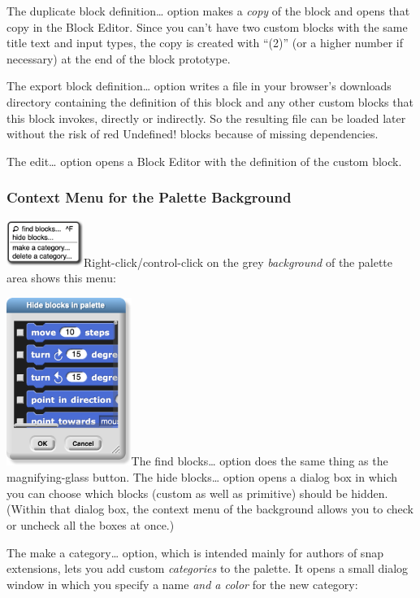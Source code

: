 The duplicate block definition\ldots{} option makes a \emph{copy} of the
block and opens that copy in the Block Editor. Since you can't have two
custom blocks with the same title text and input types, the copy is
created with ``(2)'' (or a higher number if necessary) at the end of the
block prototype.

The export block definition\ldots{} option writes a file in your
browser's downloads directory containing the definition of this block
and any other custom blocks that this block invokes, directly or
indirectly. So the resulting file can be loaded later without the risk
of red Undefined! blocks because of missing dependencies.

The edit\ldots{} option opens a Block Editor with the definition of the
custom block.

\subsubsection{Context Menu for the Palette
Background}\label{context-menu-for-the-palette-background}

\includegraphics[width=0.98958in,height=0.58958in]{media/image1058.png}Right-click/control-click
on the grey \emph{background} of the palette area shows this menu:

\includegraphics[width=1.6in,height=2.15972in]{media/image1059.png}The
find blocks\ldots{} option does the same thing as the magnifying-glass
button. The hide blocks\ldots{} option opens a dialog box in which you
can choose which blocks (custom as well as primitive) should be hidden.
(Within that dialog box, the context menu of the background allows you
to check or uncheck all the boxes at once.)

The make a category\ldots{} option, which is intended mainly for authors
of snap extensions, lets you add custom \emph{categories} to the
palette. It opens a small dialog window in which you specify a name
\emph{and a color} for the new category:

